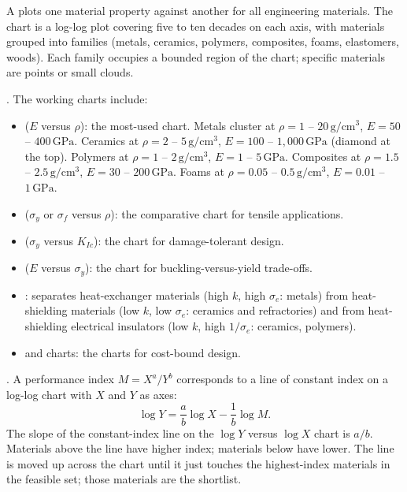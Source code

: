 A  plots one material property against
another for all engineering materials. The chart is a log-log plot
covering five to ten decades on each axis, with materials grouped
into families (metals, ceramics, polymers, composites, foams,
elastomers, woods). Each family occupies a bounded region of the
chart; specific materials are points or small clouds.

. The working charts \cite[
ch.~4]{text:ashby2017} include:

\begin{itemize}[leftmargin=*]
\item {} ($E$ versus $\rho$): the
  most-used chart. Metals cluster at $\rho = 1$ -- $20\,\text{g}/
  \text{cm}^3$, $E = 50$ -- $400\,\text{GPa}$. Ceramics at $\rho =
  2$ -- $5\,\text{g}/\text{cm}^3$, $E = 100$ -- $1{,}000\,\text{GPa}$
  (diamond at the top). Polymers at $\rho = 1$ -- $2\,\text{g}/
  \text{cm}^3$, $E = 1$ -- $5\,\text{GPa}$. Composites at $\rho =
  1.5$ -- $2.5\,\text{g}/\text{cm}^3$, $E = 30$ -- $200\,\text{GPa}$.
  Foams at $\rho = 0.05$ -- $0.5\,\text{g}/\text{cm}^3$, $E = 0.01$
  -- $1\,\text{GPa}$.
\item {} ($\sigma_y$ or $\sigma_f$
  versus $\rho$): the comparative chart for tensile applications.
\item {} ($\sigma_y$ versus $K_{Ic}$):
  the chart for damage-tolerant design.
\item {} ($E$ versus $\sigma_y$): the
  chart for buckling-versus-yield trade-offs.
\item {}:
  separates heat-exchanger materials (high $k$, high $\sigma_e$:
  metals) from heat-shielding materials (low $k$, low $\sigma_e$:
  ceramics and refractories) and from heat-shielding electrical
  insulators (low $k$, high $1/\sigma_e$: ceramics, polymers).
\item {} and  charts: the
  charts for cost-bound design.
\end{itemize}

. A performance index $M = X^a /
Y^b$ corresponds to a line of constant index on a log-log chart with
$X$ and $Y$ as axes:
\[
\log Y = \frac{a}{b} \log X - \frac{1}{b} \log M.
\]
The slope of the constant-index line on the $\log Y$ versus $\log X$
chart is $a/b$. Materials above the line have higher index; materials
below have lower. The line is moved up across the chart until it just
touches the highest-index materials in the feasible set; those
materials are the shortlist.

